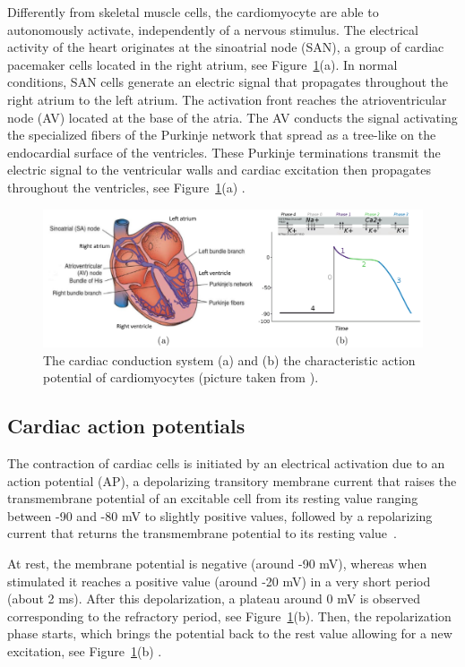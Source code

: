 \documentclass[11pt,a4paper]{article}
\begin{document}
Differently from skeletal muscle cells, the cardiomyocyte are able to autonomously activate, independently of a nervous stimulus. The electrical activity of the heart originates at the sinoatrial node (SAN), a group of cardiac pacemaker cells located in the right atrium, see Figure~\ref{fig:heart}(a). In normal conditions, SAN cells generate an electric signal that propagates throughout the right atrium to the left atrium. The activation front reaches the atrioventricular node (AV) located at the base of the atria. The AV conducts the signal activating the specialized fibers of the Purkinje network that spread as a tree-like on the endocardial surface of the ventricles. These Purkinje terminations transmit the electric signal to the ventricular walls and cardiac excitation then propagates throughout the ventricles, see Figure~\ref{fig:heart}(a) \cite{franzone2014mathematical}. 
\begin{figure}
	\centering
	\includegraphics[width=1\textwidth]{./Images/heart_activation.png}
	\caption{The cardiac conduction system (a) and (b) the characteristic action potential of cardiomyocytes (picture taken from \cite{quarteroni2019}).}
	\label{fig:heart}
\end{figure}

\subsection{Cardiac action potentials}\label{subsec:ap}

The contraction of cardiac cells is initiated by an electrical activation due to an action potential (AP), a depolarizing transitory membrane current
that raises the transmembrane potential of an excitable cell from its resting value ranging between -90 and -80 mV to slightly positive values, followed by a repolarizing current that returns the transmembrane potential to its resting value~\cite{franzone2014mathematical}. 

At rest, the membrane potential is negative (around -90 mV), whereas when stimulated it reaches a positive value (around -20 mV) in a very short period (about 2 ms). After this depolarization, a plateau around 0 mV is observed corresponding to the refractory period, see Figure~\ref{fig:heart}(b).
Then, the repolarization phase starts, which brings the potential back to
the rest value allowing for a new excitation, see Figure~\ref{fig:heart}(b) \cite{quarteroni2019}. 
\end{document}
